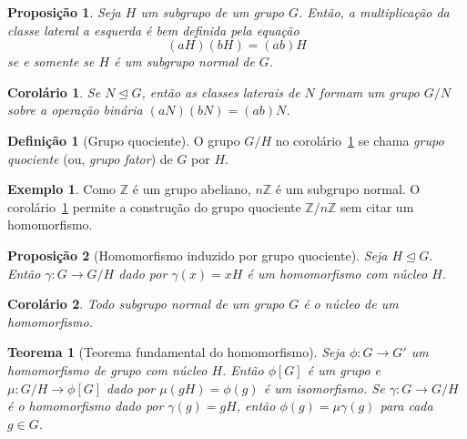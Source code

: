 \documentclass[a4paper,12pt]{report}
\theoremstyle{plain}
\newtheorem{teorema}{Teorema}[section]
\newtheorem{proposicao}{Proposição}[section]
\newtheorem{corolario}{Corolário}[section]
\theoremstyle{definition}
\newtheorem{definicao}{Definição}[section]
\newtheorem{exemplo}{Exemplo}[section]
\begin{document}
	\begin{proposicao}
		Seja $H$ um subgrupo de um grupo $G$. Então, a multiplicação da classe lateral a esquerda é bem definida pela equação
		$$(aH)(bH) = (ab)H$$
		se e somente se $H$ é um subgrupo normal de $G$.
	\end{proposicao}
	
	\begin{corolario}\label{cor:factorGroup}
		Se $N\trianglelefteq G$, então as classes laterais de $N$ formam um grupo $G/N$ sobre a operação binária $(aN)(bN) = (ab)N$.
	\end{corolario}
	
	\begin{definicao}[Grupo quociente]
		O grupo $G/H$ no corolário~\ref{cor:factorGroup} se chama \emph{grupo quociente} (ou, \emph{grupo fator}) de $G$ por $H$.
	\end{definicao}
	
	\begin{exemplo}
		Como $\mathbb{Z}$ é um grupo abeliano, $n\mathbb{Z}$ é um subgrupo normal. O corolário~\ref{cor:factorGroup} permite a construção do grupo quociente $\mathbb{Z}/n\mathbb{Z}$ sem citar um homomorfismo.
	\end{exemplo}
	
	\begin{proposicao}[Homomorfismo induzido por grupo quociente]
		Seja $H\trianglelefteq G$. Então $\gamma: G\longrightarrow G/H$ dado por $\gamma(x) = xH$ é um homomorfismo com núcleo $H$.
	\end{proposicao}
	
	\begin{corolario}
		Todo subgrupo normal de um grupo \(G\) é o núcleo
		de um homomorfismo.
	\end{corolario}
	
	\begin{teorema}[Teorema fundamental do homomorfismo]
		Seja $\phi: G\longrightarrow G'$ um homomorfismo de grupo com núcleo $H$. Então $\phi[G]$ é um grupo e $\mu: G/H \longrightarrow \phi[G]$ dado por $\mu(gH) = \phi(g)$ é um isomorfismo. Se $\gamma: G\longrightarrow G/H$ é o homomorfismo dado por $\gamma(g) = gH$, então $\phi(g) = \mu\gamma(g)$ para cada $g\in G$.
	\end{teorema}
	
	
	
	
\end{document}
